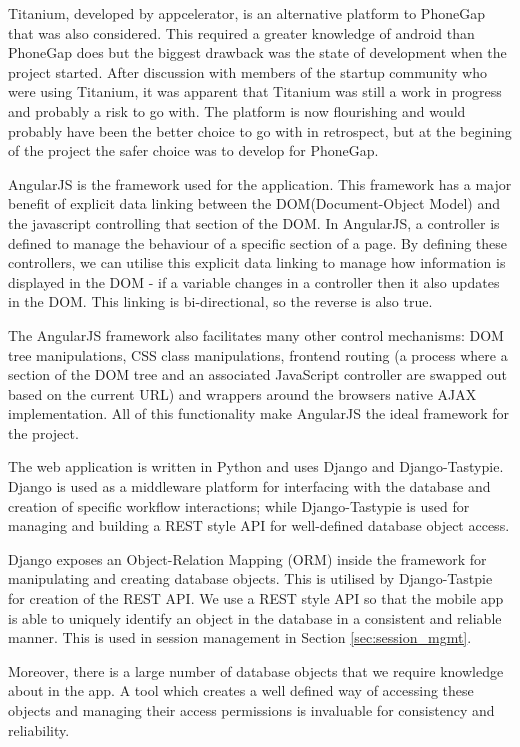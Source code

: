 Titanium, developed by appcelerator\cite{titanium}, is an alternative
platform to PhoneGap that was also considered. This required a greater
knowledge of android than PhoneGap does but the biggest drawback was
the state of development when the project started. After discussion
with members of the startup community who were using Titanium, it was
apparent that Titanium was still a work in progress and probably a
risk to go with. The platform is now flourishing and would probably
have been the better choice to go with in retrospect, but at the
begining of the project the safer choice was to develop for PhoneGap.

AngularJS\cite{angularjs} is the framework used for the
application. This framework has a major benefit of explicit data linking
between the DOM(Document-Object Model) and the javascript controlling
that section of the DOM. In AngularJS, a controller is defined to
manage the behaviour of a specific section of a page. By defining
these controllers, we can utilise this explicit data linking to manage
how information is displayed in the DOM - if a variable changes in a
controller then it also updates in the DOM. This linking is
bi-directional, so the reverse is also true. 

The AngularJS framework also facilitates many other control
mechanisms: DOM tree manipulations, CSS class manipulations, frontend
routing (a process where a section of the DOM tree and an associated
JavaScript controller are swapped out based on the current URL) and
wrappers around the browsers native AJAX implementation. All of this
functionality make AngularJS the ideal framework for the project. 

The web application is written in Python and uses Django\cite{django}
and Django-Tastypie\cite{tastypie}. Django is used as a middleware
platform for interfacing with the database and creation of specific
workflow interactions; while Django-Tastypie is used for managing and
building a REST style API for well-defined database object access.

Django exposes an Object-Relation Mapping (ORM) inside the framework
for manipulating and creating database objects. This is utilised by
Django-Tastpie for creation of the REST API. We use a REST style API
so that the mobile app is able to uniquely identify an object in the
database in a consistent and reliable manner. This is used in 
session management in Section \ref{sec:session_mgmt}.

Moreover, there is a large number of database objects that we require
knowledge about in the app. A tool which creates a well defined way of
accessing these objects and managing their access permissions is
invaluable for consistency and reliability.

